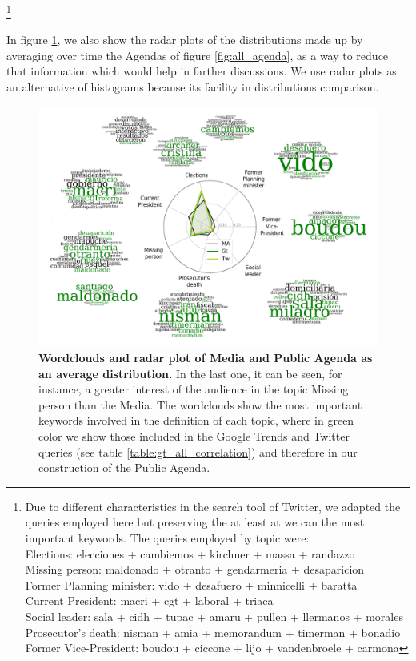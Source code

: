 \footnote{Due to different characteristics in the search tool of Twitter, we adapted the queries employed here but preserving the at least at we can the most important keywords. The queries employed by topic were: \\
Elections: elecciones + cambiemos + kirchner + massa + randazzo \\
Missing person: maldonado + otranto + gendarmeria + desaparicion \\
Former Planning minister: vido + desafuero + minnicelli + baratta \\
Current President: macri + cgt + laboral +  triaca \\
Social leader:  sala + cidh + tupac + amaru + pullen + llermanos + morales \\
Prosecutor’s death: nisman + amia + memorandum + timerman +  bonadio \\
Former Vice-President:  boudou + ciccone +  lijo + vandenbroele + carmona
}

\par In figure \ref{fig:topics_wordclouds}, we also show the radar plots of the distributions made up by averaging over time the Agendas of figure \ref{fig:all_agenda}, as a way to reduce that information which would help in farther discussions. We use radar plots as an alternative of histograms because its facility in distributions comparison.  

\begin{figure}[h]
\centering
\includegraphics[width = \textwidth]{images/Fig2.pdf}
\caption{\textbf{Wordclouds and radar plot of Media and Public Agenda as an average distribution.}
In the last one, it can be seen, for instance, a greater interest of the audience in the topic Missing person than the Media. 
The wordclouds show the most important keywords involved in the definition of each topic, where in green color we show those included in the Google Trends and Twitter queries (see table \ref{table:gt_all_correlation}) and therefore in our construction of the Public Agenda.
}
\label{fig:topics_wordclouds}
\end{figure}

